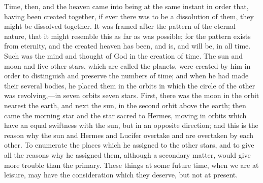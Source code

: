 \documentclass[11pt,letter]{article}
\begin{document}
\par  Time, then, and the heaven came into being at the same instant in order that, having been created together, if ever there was to be a dissolution of them, they might be dissolved together. It was framed after the pattern of the eternal nature, that it might resemble this as far as was possible; for the pattern exists from eternity, and the created heaven has been, and is, and will be, in all time. Such was the mind and thought of God in the creation of time. The sun and moon and five other stars, which are called the planets, were created by him in order to distinguish and preserve the numbers of time; and when he had made their several bodies, he placed them in the orbits in which the circle of the other was revolving,—in seven orbits seven stars. First, there was the moon in the orbit nearest the earth, and next the sun, in the second orbit above the earth; then came the morning star and the star sacred to Hermes, moving in orbits which have an equal swiftness with the sun, but in an opposite direction; and this is the reason why the sun and Hermes and Lucifer overtake and are overtaken by each other. To enumerate the places which he assigned to the other stars, and to give all the reasons why he assigned them, although a secondary matter, would give more trouble than the primary. These things at some future time, when we are at leisure, may have the consideration which they deserve, but not at present.
\end{document}
